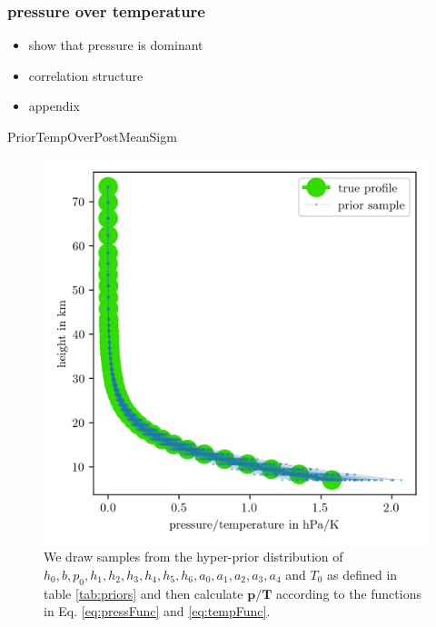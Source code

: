 \subsubsection{pressure over temperature}


\begin{itemize}
	\item show that pressure is dominant
	\item correlation structure
	\item appendix
\end{itemize}

PriorTempOverPostMeanSigm



\begin{figure}[ht!]
	\centering
	\includegraphics{PriorTempOverPostMeanSigm.png}
	\caption[Prior Samples of $\bm{p}/\bm{T}$ according to the respective hyper-prior distribution.]{We draw samples from the hyper-prior distribution of $h_0, b, p_0, h_1, h_2,h_3,h_4,h_5,h_6, a_0, a_1, a_2,a_3,a_4$ and $T_0$ as defined in table \ref{tab:priors} and then calculate $\bm{p}/\bm{T}$ according to the functions in Eq. \ref{eq:pressFunc} and \ref{eq:tempFunc}.}
	\label{fig:PriorPressOverTemp}
\end{figure}

